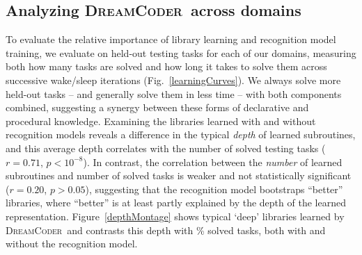 \documentclass{article}
\newcommand{\system}{\textsc{DreamCoder}~}
\begin{document}
\subsection{Analyzing \system across domains}\label{quantitative}
To evaluate the relative importance of library learning and recognition
model training, we evaluate on held-out testing tasks for each of our
domains, measuring both how many tasks are solved and how long it
takes to solve them across successive wake/sleep iterations
(Fig.~\ref{learningCurves}).  We always solve more held-out tasks --
and generally solve them in less time -- with both components
combined, suggesting a synergy between these forms of declarative and procedural knowledge.
Examining the libraries learned with and without
recognition models reveals a difference in the typical \emph{depth}
of learned subroutines, and this average depth correlates
with the number of solved testing tasks ($r=0.71$, $p < 10^{-8}$).
In contrast, the correlation between the \emph{number} of learned subroutines and number of solved tasks is weaker and not statistically significant ($r=0.20$, $p > 0.05$),
suggesting that the recognition model bootstraps
``better'' libraries, where ``better'' is at least partly explained by the depth
of the learned representation. Figure~\ref{depthMontage} shows typical `deep' libraries learned by
\system and contrasts this depth with \% solved tasks, both with and without the recognition model.
\end{document}
